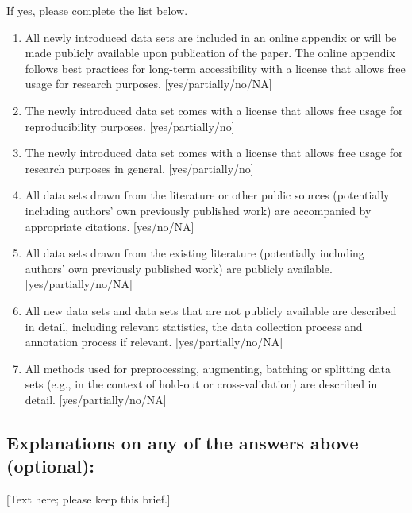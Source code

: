 If yes, please complete the list below.
\begin{enumerate}
    \item 
    All newly introduced data sets 
    are included in an online appendix 
    or will be made publicly available upon publication of the paper.
    The online appendix follows best practices for long-term accessibility with a license
    that allows free usage for research purposes.
    [yes/partially/no/NA]
    \item The newly introduced data set comes with a license that
    allows free usage for reproducibility purposes.
    [yes/partially/no]
    \item The newly introduced data set comes with a license that
    allows free usage for research purposes in general.
    [yes/partially/no]
    \item All data sets drawn from the literature or other public sources (potentially including authors' own previously published work) are accompanied by appropriate citations.
    [yes/no/NA]
    \item All data sets drawn from the existing literature (potentially including authors’ own previously published work) are publicly available. [yes/partially/no/NA]
    \item All new data sets and data sets that are not publicly available are described in detail, including relevant statistics, the data collection process and annotation process if relevant.
    [yes/partially/no/NA]
    \item 
    All methods used for preprocessing, augmenting, batching or splitting data sets (e.g., in the context of hold-out or cross-validation)
    are described in detail. [yes/partially/no/NA]
\end{enumerate}

\subsection*{Explanations on any of the answers above (optional):}

[Text here; please keep this brief.]
